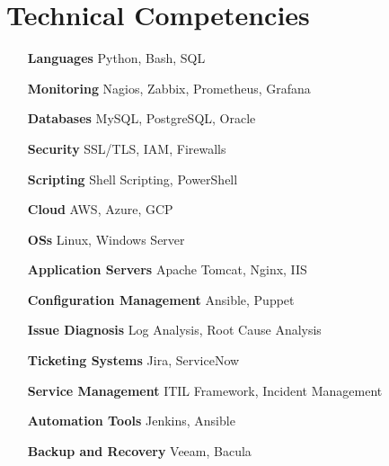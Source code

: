 \section{Technical Competencies}

\begin{multicols}{2}
    \begin{itemize}[itemsep=-2px, parsep=1pt, leftmargin=75pt]
        \item[\textbf{Languages}] Python, Bash, SQL
        \item[\textbf{Monitoring}] Nagios, Zabbix, Prometheus, Grafana
        \item[\textbf{Databases}] MySQL, PostgreSQL, Oracle
        \item[\textbf{Security}] SSL/TLS, IAM, Firewalls
        \item[\textbf{Scripting}] Shell Scripting, PowerShell
        \item[\textbf{Cloud}] AWS, Azure, GCP
        \item[\textbf{OSs}] Linux, Windows Server
        \item[\textbf{Application Servers}] Apache Tomcat, Nginx, IIS
        \item[\textbf{Configuration Management}] Ansible, Puppet
        \item[\textbf{Issue Diagnosis}] Log Analysis, Root Cause Analysis
        \item[\textbf{Ticketing Systems}] Jira, ServiceNow
        \item[\textbf{Service Management}] ITIL Framework, Incident Management
        \item[\textbf{Automation Tools}] Jenkins, Ansible
        \item[\textbf{Backup and Recovery}] Veeam, Bacula
    \end{itemize}
\end{multicols}
